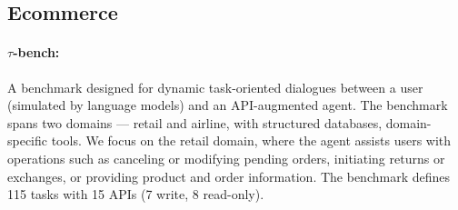 \subsection{Ecommerce}

\paragraph{$\tau$-bench:} A benchmark designed for dynamic task-oriented dialogues between a user (simulated by language models) and an API-augmented agent. The benchmark spans two domains — retail and airline, with structured databases, domain-specific tools. We focus on the retail domain, where the agent assists users with operations such as canceling or modifying pending orders, initiating returns or exchanges, or providing product and order information. The benchmark defines 115 tasks with 15 APIs (7 write, 8 read-only).





